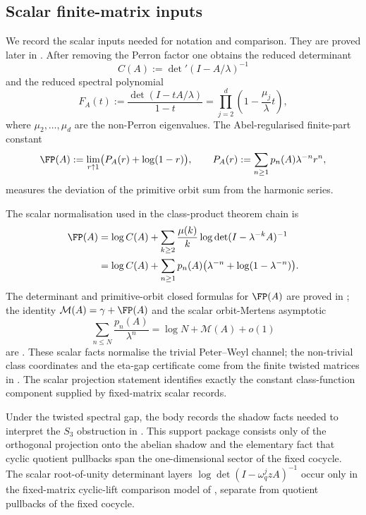 \subsection{Scalar finite-matrix inputs}

We record the scalar inputs needed for notation and comparison.
They are proved later in . After removing the
Perron factor one obtains the reduced determinant
\[
  C(A):=\det\nolimits'(I-A/\lambda)^{-1}
\]
and the reduced spectral polynomial
\[
  F_A(t):=\frac{\det(I-tA/\lambda)}{1-t}
  =\prod_{j=2}^d\left(1-\frac{\mu_j}{\lambda}t\right),
\]
where \(\mu_2,\dots,\mu_d\) are the non-Perron eigenvalues. The
Abel-regularised finite-part constant
\[
  \FP(A):=\lim_{r\uparrow 1}\bigl(P_A(r)+\log(1-r)\bigr),
  \qquad
  P_A(r):=\sum_{n\ge 1}p_n(A)\lambda^{-n}r^n,
\]
measures the deviation of the primitive orbit sum from the harmonic
series.

The scalar normalisation used in the class-product theorem chain is
\begin{align*}
  \FP(A)
  &=\log C(A)
    +\sum_{k\ge 2}\frac{\mu(k)}{k}
      \log\det(I-\lambda^{-k}A)^{-1}\\
  &=\log C(A)
    +\sum_{n\ge 1}p_n(A)
      \bigl(\lambda^{-n}+\log(1-\lambda^{-n})\bigr).
\end{align*}
The determinant and primitive-orbit closed formulas for \(\FP(A)\) are proved
in ; the identity
\(\mathcal M(A)=\gamma+\FP(A)\) and the scalar orbit-Mertens asymptotic
\[
  \sum_{n\le N}\frac{p_n(A)}{\lambda^n}
  =\log N+\mathcal M(A)+o(1)
\]
are .  These scalar facts normalise
the trivial Peter--Weyl channel; the non-trivial class coordinates and the
eta-gap certificate come from the finite twisted matrices in
.
The scalar projection statement
 identifies exactly the
constant class-function component supplied by fixed-matrix scalar records.

Under the twisted spectral gap, the body records the shadow facts needed to
interpret the \(S_3\) obstruction in
.
This support package consists only of the orthogonal projection onto the
abelian shadow and the elementary fact that cyclic quotient pullbacks span the
one-dimensional sector of the fixed cocycle.  The
scalar root-of-unity determinant layers
\(\log\det(I-\omega_q^jzA)^{-1}\) occur only in the fixed-matrix cyclic-lift
comparison model of , separate from quotient pullbacks
of the fixed cocycle.

